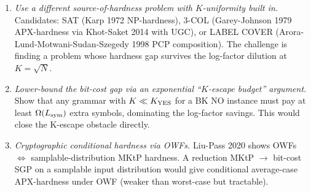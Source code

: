 \documentclass[
]{article}
\begin{document}
\begin{enumerate}
incompatible with the $K$-shift requirement
($K_{\rm Charikar} \sim \sqrt{N}$ needs $|V| \sim \sqrt{N}$, which
forces $|E| = \omega(|V|)$). This attack vector is therefore
\emph{closed negatively}: density-shifted BK cannot work because
the two requirements (constant VC gap on $H$; $K_{\rm Charikar}(H)
\sim \sqrt{N}$ in Charikar's encoding) are mutually exclusive
in the BK $\to$ Charikar framework. The Austrin--Khot--Safra 2011
result ($2 - (2+o_d(1))\log\log d/\log d$ UG-hardness for VC on
degree-$d$ graphs) gives a larger gap as $d \to \infty$, but is
(a) Unique-Games-conditional rather than NP-hard, and (b) the
underlying graphs are still sparse ($|E| = O(d|V|/2)$), so
$K_{\rm Charikar} \sim |V|$ remains far above $\sqrt{N}$ unless
one uses $|V| \sim \sqrt{N}$, which then requires $d \sim
\sqrt{N}$ on $|V| = \sqrt{N}$ vertices --- producing complete
graphs again. The Dinur--Safra 2005 result gives a stronger
NP-hardness factor of $\approx 1.36$ on graphs of ``sufficiently
large vertex degree'', but the Dinur--Safra hardness graphs
(FGLSS-style from PCP composition with intersection-graph
structure) do not admit a direct Charikar encoding preserving the
$K$-shift; this remains a possible direction under item 2 if the
FGLSS structural overhead can be absorbed into the SGP encoding,
but is not addressed by the present density-shifted attack
vector. Alternative attack vectors (items 2, 3, 4 below) remain
open.
\item \emph{Use a different source-of-hardness problem with
$K$-uniformity built in.} Candidates: SAT (Karp 1972 NP-hardness),
3-COL (Garey-Johnson 1979 APX-hardness via Khot-Saket 2014 with UGC),
or LABEL COVER (Arora-Lund-Motwani-Sudan-Szegedy 1998 PCP composition).
The challenge is finding a problem whose hardness gap survives the
log-factor dilution at $K = \sqrt{N}$.
\item \emph{Lower-bound the bit-cost gap via an exponential
``$K$-escape budget'' argument.} Show that any grammar with $K \ll
K_{\rm YES}$ for a BK NO instance must pay at least $\Omega(L_{\rm sym})$
extra symbols, dominating the log-factor savings. This would close
the K-escape obstacle directly.
\item \emph{Cryptographic conditional hardness via OWFs.} Liu-Pass 2020
shows OWFs $\Leftrightarrow$ samplable-distribution MKtP hardness.
A reduction MKtP $\to$ bit-cost SGP on a samplable input distribution
would give conditional average-case APX-hardness under OWF (weaker
than worst-case but tractable).
\end{enumerate}
\end{document}
